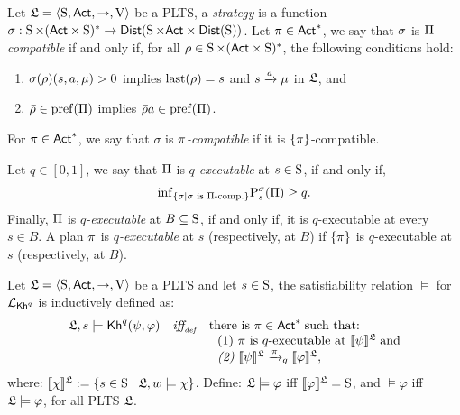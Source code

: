 \begin{definition}\label{def:strategy-comp-exec}
    Let $\model=\tup{\S,\ACT,\ra,\V}$ be a PLTS, a \emph{strategy} is a function $\strategy: \S\times(\ACT\times\S)^* \ra \dist(\S\times\ACT\times\dist(\S))$. Let $\plan\in\ACT^*$, we say that $\strategy$ is \emph{$\plans$-compatible} if and only if, for all $\rho\in \S\times(\ACT\times\S)^*$, the following conditions hold:
    \begin{enumerate}
        \item $\strategy(\rho)(s,a,\mu)>0$ implies $\last(\rho)=s$ and $s\reach{a}\mu$ in $\model$, and 
        \item $\bar{\rho}\in\pref(\plans)$ implies $\bar{\rho}a\in\pref(\plans)$.
    \end{enumerate}
    For $\plan\in\ACT^*$, we say that $\sigma$ is \emph{$\plan$-compatible} if it is $\{\plan\}$-compatible. 

    Let $q\in[0,1]$, we say that $\plans$ is \emph{$q$-executable} at $s\in\S$, if and only if, 
    \[
        \infim_{\{\strategy \mid \strategy \text{ is } \plans\text{-comp.}\}} \probability^\strategy_{s}(\plans)\geq q.
    \]
    Finally, $\plans$ is \emph{$q$-executable} at $B\subseteq\S$, if and only if, it is $q$-executable at every $s\in B$. 
    A plan $\plan$ is \emph{$q$-executable} at $s$ (respectively, at $B$) if $\{\plan\}$ is $q$-executable at $s$ (respectively, at $B$). 
\end{definition}

\begin{definition}
    Let $\model = \tup{\S,\ACT,\ra,\V}$ be a PLTS and let $s\in\S$, the satisfiability relation $\models$ for $\PKh$ is inductively defined as:
    \[
        \begin{array}{l@{\ \ \ }c@{\ \ \  }l}
        \model, s \models \kh^q(\psi,\varphi) & \iffdef & \text{there is } \plan \in \ACT^* \;\text{such that:} \\
        & & \ \ \text{\rm (1)} \ \plan \text{ is $q$-executable at }  \truthset{\model}{\psi}\; \text{and} \\
        & & \ \ \text{\em (2)} \ \truthset{\model}{\psi} \reach{\plan}_q \truthset{\model}{\varphi}, 
        \end{array}
        \] 
        where: $\truthset{\model}{\chi} := \csetsc{s\in\S}{\model,w\models\chi}$. Define: $\model\models\varphi$ iff  $\truthset{\model}{\varphi}=\S$, and $\models\varphi$ iff $\model\models\varphi$, for all PLTS $\model$.
\end{definition}

